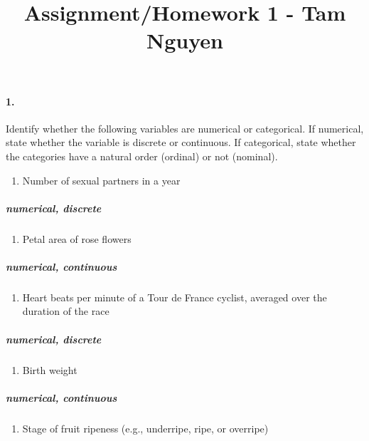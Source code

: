 \documentclass[]{article}
\title{Assignment/Homework 1 - Tam Nguyen}
\author{}
\date{}
\providecommand{\tightlist}{%
  \setlength{\itemsep}{0pt}\setlength{\parskip}{0pt}}
\let\oldparagraph\paragraph
\renewcommand{\paragraph}[1]{\oldparagraph{#1}\mbox{}}
\let\oldsubparagraph\subparagraph
\renewcommand{\subparagraph}[1]{\oldsubparagraph{#1}\mbox{}}
\begin{document}
\maketitle

\paragraph{1.}\label{section}

Identify whether the following variables are numerical or categorical.
If numerical, state whether the variable is discrete or continuous. If
categorical, state whether the categories have a natural order (ordinal)
or not (nominal).

\begin{enumerate}
\def\labelenumi{\alph{enumi}.}
\tightlist
\item
  Number of sexual partners in a year
\end{enumerate}

\subparagraph{numerical, discrete}\label{numerical-discrete}

\begin{enumerate}
\def\labelenumi{\alph{enumi}.}
\setcounter{enumi}{1}
\tightlist
\item
  Petal area of rose flowers
\end{enumerate}

\subparagraph{numerical, continuous}\label{numerical-continuous}

\begin{enumerate}
\def\labelenumi{\alph{enumi}.}
\setcounter{enumi}{2}
\tightlist
\item
  Heart beats per minute of a Tour de France cyclist, averaged over the
  duration of the race
\end{enumerate}

\subparagraph{numerical, discrete}\label{numerical-discrete-1}

\begin{enumerate}
\def\labelenumi{\alph{enumi}.}
\setcounter{enumi}{3}
\tightlist
\item
  Birth weight
\end{enumerate}

\subparagraph{numerical, continuous}\label{numerical-continuous-1}

\begin{enumerate}
\def\labelenumi{\alph{enumi}.}
\setcounter{enumi}{4}
\tightlist
\item
  Stage of fruit ripeness (e.g., underripe, ripe, or overripe)
\end{enumerate}
\end{document}

